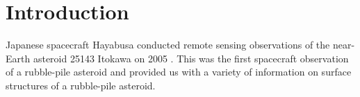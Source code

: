 \documentclass[3p,authoryear]{elsarticle}
\begin{document}
\tableofcontents
\linenumbers

\section{Introduction}\label{sec:intro}

Japanese spacecraft Hayabusa conducted remote sensing observations of the near-Earth asteroid 25143 Itokawa on 2005 \citep{fujiwara2006, saito2006}. 
This was the first spacecraft observation of a rubble-pile asteroid and provided us with a variety of information on surface structures of a rubble-pile asteroid.
\end{document}
